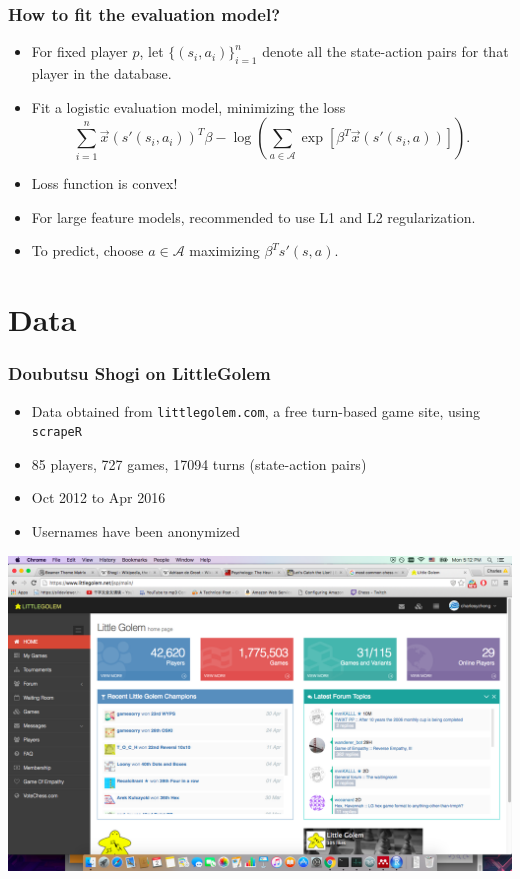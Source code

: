 \documentclass{beamer}
\begin{document}
\begin{frame}
\frametitle{How to fit the evaluation model?}
\begin{itemize}
\item For fixed player $p$, let $\{(s_i, a_i)\}_{i=1}^n$ denote all the state-action pairs for that player in the database.
\item Fit a logistic evaluation model, minimizing the loss
\[
\sum_{i=1}^n \vec{x}(s'(s_i, a_i))^T \beta - \log(\sum_{a \in \mathcal{A}} \exp[\beta^T \vec{x}(s'(s_i, a))]).
\]
\item Loss function is convex!
\item For large feature models, recommended to use L1 and L2 regularization.
\item To predict, choose $a \in \mathcal{A}$ maximizing $\beta^T s'(s, a)$.
\end{itemize}
\end{frame}

\section{Data}

\begin{frame}
\sectionpage
\end{frame}

\begin{frame}
\frametitle{Doubutsu Shogi on LittleGolem}
\begin{itemize}
\item Data obtained from {\tt littlegolem.com}, a free turn-based game site, using {\tt scrapeR}
\item 85 players, 727 games, 17094 turns (state-action pairs)
\item Oct 2012 to Apr 2016
\item Usernames have been anonymized
\end{itemize}
\begin{center}
\includegraphics[scale = 0.1]{lg.png}
\end{center}
\end{frame}
\end{document}

